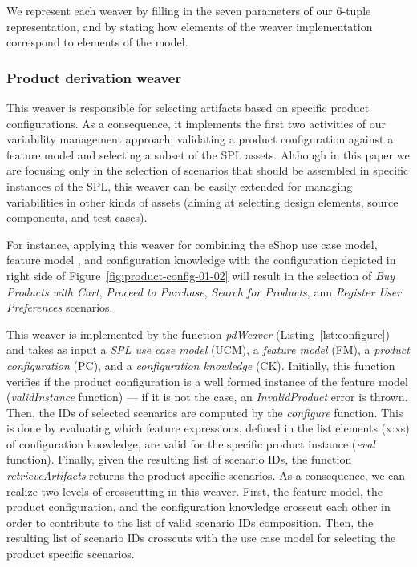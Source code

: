 \documentclass{acm_proc_article-sp}
\begin{document}
We represent each weaver by 
filling in the seven parameters of our 6-tuple representation, and by stating 
how elements of the weaver implementation correspond to elements of the model.

\subsubsection{Product derivation weaver}\label{sub:pd-weaver}

This weaver is responsible for selecting artifacts based on specific product configurations. 
As a consequence, it implements the first two activities of our variability management approach: 
validating a product configuration against  a feature model and selecting a subset of the SPL assets. 
Although in this paper we are focusing only in the selection of scenarios that should be assembled in specific instances 
of the SPL, this weaver can be easily extended for managing variabilities in other kinds of assets (aiming at selecting design elements, source components, and test cases). 

For instance, applying this weaver for combining the eShop use case model, feature model , and configuration knowledge with the configuration depicted in right side of Figure~\ref{fig:product-config-01-02} will result in the selection of  \emph{Buy Products with Cart}, \emph{Proceed to Purchase}, \emph{Search for Products}, ann \emph{Register User Preferences} scenarios.  
 
This weaver is implemented by the function \emph{pdWeaver} (Listing~\ref{lst:configure}) and takes as input 
a \emph{SPL use case model} (UCM), a \emph{feature model} (FM), a \emph{product configuration} (PC), and a \emph{configuration knowledge} (CK). Initially, this function verifies if the product configuration is a well formed instance of the feature model (\emph{validInstance} function) --- if it is not the case,  an \emph{InvalidProduct} error is thrown. Then, the IDs of selected scenarios are computed by the \emph{configure} function. This is done by evaluating which feature expressions, defined in the list elements (x:xs) of configuration knowledge, are valid for the specific product instance (\emph{eval} function). Finally, given the resulting list of scenario IDs, the function \emph{retrieveArtifacts} returns the product specific scenarios. 
As a consequence, we can realize two levels of crosscutting in this weaver. First, the feature model, the product configuration, and the configuration knowledge crosscut each other in order to contribute to the list of valid scenario IDs composition. Then, the resulting list of scenario IDs crosscuts with the use case model for selecting the product specific scenarios.    
\end{document}
